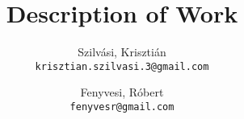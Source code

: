 \documentclass[11 pt,a4paper,english]{article}
\title{Description of Work}
\author{
	Szilvási, Krisztián\\
	\texttt{krisztian.szilvasi.3@gmail.com}
	\and
	Fenyvesi, Róbert\\
	\texttt{fenyvesr@gmail.com}
}
\begin{document}
\maketitle

\newpage



\tableofcontents

\newpage



\newpage





\printglossaries

\section{}
\end{document}
